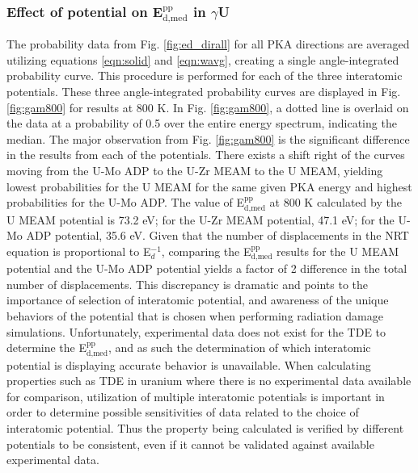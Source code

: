 \documentclass[review]{elsarticle}
\begin{document}
\FloatBarrier

\subsubsection{Effect of potential on E$^{\textrm{pp}}_{\textrm{d,med}}$ in $\gamma$U}

The probability data from Fig. \ref{fig:ed_dirall} for all PKA directions are averaged utilizing equations \ref{eqn:solid} and \ref{eqn:wavg}, creating a single angle-integrated probability curve. This procedure is performed for each of the three interatomic potentials. These three angle-integrated probability curves are displayed in Fig. \ref{fig:gam800} for results at 800 K. In Fig. \ref{fig:gam800}, a dotted line is overlaid on the data at a probability of 0.5 over the entire energy spectrum, indicating the median. The major observation from Fig. \ref{fig:gam800} is the significant difference in the results from each of the potentials. There exists a shift right of the curves moving from the U-Mo ADP to the U-Zr MEAM to the U MEAM, yielding lowest probabilities for the U MEAM for the same given PKA energy and highest probabilities for the U-Mo ADP. The value of E$^{\textrm{pp}}_{\textrm{d,med}}$ at 800 K calculated by the U MEAM potential is 73.2 eV; for the U-Zr MEAM potential, 47.1 eV; for the U-Mo ADP potential, 35.6 eV. Given that the number of displacements in the NRT equation \cite{norgett1975} is proportional to E$_{d}^{-1}$, comparing the E$^{\textrm{pp}}_{\textrm{d,med}}$ results for the U MEAM potential and the U-Mo ADP potential yields a factor of 2 difference in the total number of displacements. This discrepancy is dramatic and points to the importance of selection of interatomic potential, and awareness of the unique behaviors of the potential that is chosen when performing radiation damage simulations. Unfortunately, experimental data does not exist for the TDE to determine the E$^{\textrm{pp}}_{\textrm{d,med}}$, and as such the determination of which interatomic potential is displaying accurate behavior is unavailable. When calculating properties such as TDE in uranium where there is no experimental data available for comparison, utilization of multiple interatomic potentials is important in order to determine possible sensitivities of data related to the choice of interatomic potential. Thus the property being calculated is verified by different potentials to be consistent, even if it cannot be validated against available experimental data.
\end{document}
